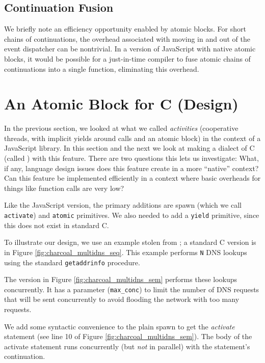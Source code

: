 \documentclass[acmsmall,anonymous,review]{acmart}\settopmatter{printfolios=true,printccs=false,printacmref=false}
\begin{document}
\subsection{Continuation Fusion}

We briefly note an efficiency opportunity enabled by atomic blocks.
For short chains of continuations, the overhead associated with moving in and out of the event dispatcher can be nontrivial.
In a version of JavaScript with native atomic blocks, it would be possible for a just-in-time compiler to fuse atomic chains of continuations into a single function, eliminating this overhead.


\section{An Atomic Block for C (Design)}

In the previous section, we looked at what we called \emph{activities} (cooperative threads, with implicit yields around calls and an atomic block) in the context of a JavaScript library.
In this section and the next we look at making a dialect of C (called \charcoal{}) with this feature.
There are two questions this lets us investigate:
What, if any, language design issues does this feature create in a more ``native'' context?
Can this feature be implemented efficiently in a context where basic overheads for things like function calls are very low?

Like the JavaScript version, the primary additions are spawn (which we call \texttt{activate}) and \texttt{atomic} primitives.
We also needed to add a \texttt{yield} primitive, since this does not exist in standard C.

To illustrate our design, we use an example stolen from \cite{Krohn2007}; a standard C version is in Figure \ref{fig:charcoal_multidns_seq}.
This example performs \texttt{N} DNS lookups using the standard \texttt{getaddrinfo} procedure.

The \charcoal{} version in Figure \ref{fig:charcoal_multidns_sem} performs these lookups concurrently.
It has a parameter (\texttt{max\_conc}) to limit the number of DNS requests that will be sent concurrently to avoid flooding the network with too many requests.

We add some syntactic convenience to the plain spawn to get the \emph{activate} statement (see line 10 of Figure \ref{fig:charcoal_multidns_sem}).
The body of the activate statement runs concurrently (but \emph{not} in parallel) with the statement's continuation.
\end{document}
